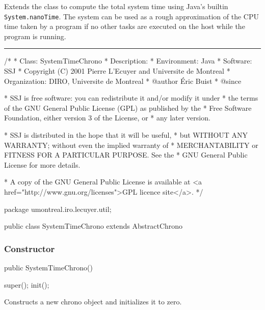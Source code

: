 
Extends the  class to compute
the total system time using Java's builtin \texttt{System.nanoTime}.
The system can be used as a rough approximation of the CPU time taken
by a program if no
other tasks are executed on the host while the program is running.

\bigskip\hrule

\begin{code}
\begin{hide}
/*
 * Class:        SystemTimeChrono
 * Description:  
 * Environment:  Java
 * Software:     SSJ 
 * Copyright (C) 2001  Pierre L'Ecuyer and Universite de Montreal
 * Organization: DIRO, Universite de Montreal
 * @author       Éric Buist
 * @since

 * SSJ is free software: you can redistribute it and/or modify it under
 * the terms of the GNU General Public License (GPL) as published by the
 * Free Software Foundation, either version 3 of the License, or
 * any later version.

 * SSJ is distributed in the hope that it will be useful,
 * but WITHOUT ANY WARRANTY; without even the implied warranty of
 * MERCHANTABILITY or FITNESS FOR A PARTICULAR PURPOSE.  See the
 * GNU General Public License for more details.

 * A copy of the GNU General Public License is available at
   <a href="http://www.gnu.org/licenses">GPL licence site</a>.
 */
\end{hide}
package umontreal.iro.lecuyer.util;


public class SystemTimeChrono extends AbstractChrono\begin{hide} {

   protected void getTime (long[] tab) {
      long rawTime = System.nanoTime();
      final long DIV = 1000000000L;
      long seconds = rawTime/DIV;
      long micros = (rawTime %
      tab[0] = seconds;
      tab[1] = micros;
   }\end{hide}
\end{code}

\subsubsection*{Constructor}

\begin{code}

   public SystemTimeChrono()\begin{hide} {
      super();
      init();
   }\end{hide}
\end{code}
  \begin{tabb} Constructs a new chrono object and
    initializes it to zero.
  \end{tabb}
\begin{code}
\begin{hide}
}\end{hide}
\end{code}
